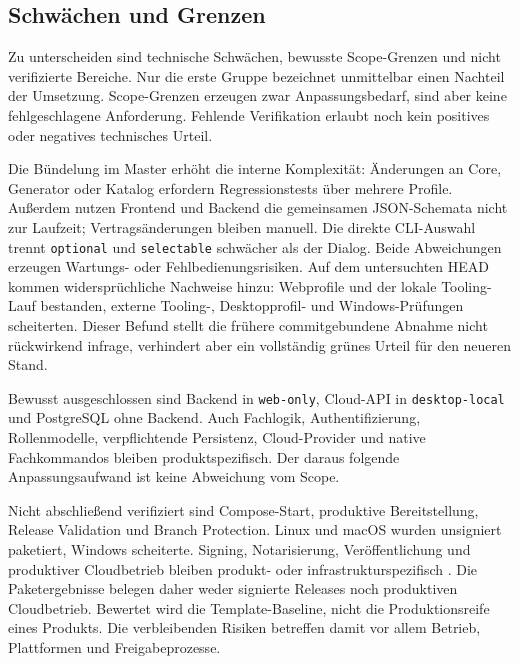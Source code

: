 \subsection{Schwächen und Grenzen}
\label{subsec:schwaechen-grenzen}

Zu unterscheiden sind technische Schwächen, bewusste Scope-Grenzen und nicht
verifizierte Bereiche. Nur die erste Gruppe bezeichnet unmittelbar einen
Nachteil der Umsetzung.
Scope-Grenzen erzeugen zwar Anpassungsbedarf, sind aber keine fehlgeschlagene
Anforderung. Fehlende Verifikation erlaubt noch kein positives oder negatives
technisches Urteil.

Die Bündelung im Master erhöht die interne Komplexität: Änderungen an Core,
Generator oder Katalog erfordern Regressionstests über mehrere Profile.
Außerdem nutzen Frontend und Backend die gemeinsamen JSON-Schemata nicht zur
Laufzeit; Vertragsänderungen bleiben manuell. Die direkte CLI-Auswahl trennt
\texttt{optional} und \texttt{selectable} schwächer als der Dialog. Beide
Abweichungen erzeugen Wartungs- oder Fehlbedienungsrisiken. Auf dem
untersuchten HEAD kommen widersprüchliche Nachweise hinzu: Webprofile und der
lokale Tooling-Lauf bestanden, externe Tooling-, Desktopprofil- und
Windows-Prüfungen scheiterten.
Dieser Befund stellt die frühere commitgebundene Abnahme nicht rückwirkend
infrage, verhindert aber ein vollständig grünes Urteil für den neueren Stand.

Bewusst ausgeschlossen sind Backend in \texttt{web-only}, Cloud-API in
\texttt{desktop-local} und PostgreSQL ohne Backend. Auch Fachlogik,
Authentifizierung, Rollenmodelle, verpflichtende Persistenz, Cloud-Provider
und native Fachkommandos bleiben produktspezifisch. Der daraus folgende
Anpassungsaufwand ist keine Abweichung vom Scope.

Nicht abschließend verifiziert sind Compose-Start, produktive Bereitstellung,
Release Validation und Branch Protection. Linux und macOS wurden unsigniert
paketiert, Windows scheiterte. Signing, Notarisierung, Veröffentlichung und
produktiver Cloudbetrieb bleiben produkt- oder infrastrukturspezifisch
\parencite{kleiveist2026ci-core-run,kleiveist2026ci-desktop-run,kleiveist2026acceptance}.
Die Paketergebnisse belegen daher weder signierte Releases noch produktiven
Cloudbetrieb. Bewertet wird die Template-Baseline, nicht die Produktionsreife
eines Produkts.
Die verbleibenden Risiken betreffen damit vor allem Betrieb, Plattformen und
Freigabeprozesse.
